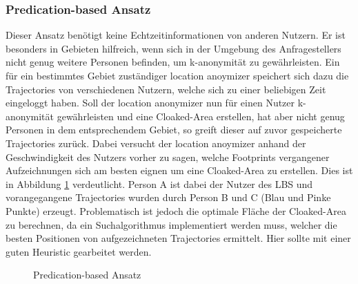\subsubsection{Predication-based Ansatz} 
Dieser Ansatz benötigt keine Echtzeitinformationen von anderen Nutzern. Er ist besonders in Gebieten hilfreich, wenn sich in der Umgebung des Anfragestellers nicht genug weitere Personen befinden, um k-anonymität zu gewährleisten. Ein für ein bestimmtes Gebiet zuständiger location anoymizer speichert sich dazu die Trajectories von verschiedenen Nutzern, welche sich zu einer beliebigen Zeit eingeloggt haben. Soll der location anonymizer nun für einen Nutzer k-anonymität gewährleisten und eine Cloaked-Area erstellen, hat aber nicht genug Personen in dem entsprechendem Gebiet, so greift dieser auf zuvor gespeicherte Trajectories zurück. Dabei versucht der location anoymizer anhand der Geschwindigkeit des Nutzers vorher zu sagen, welche Footprints vergangener Aufzeichnungen sich am besten eignen um eine Cloaked-Area zu erstellen. Dies ist in Abbildung \ref{fig_chow2011_PredicationBased-Ansatz} verdeutlicht. Person A ist dabei der Nutzer des LBS und vorangegangene Trajectories wurden durch Person B und C (Blau und Pinke Punkte) erzeugt. Problematisch ist jedoch die optimale Fläche der Cloaked-Area zu berechnen, da ein Suchalgorithmus implementiert werden muss, welcher die besten Positionen von aufgezeichneten Trajectories ermittelt. Hier sollte mit einer guten Heuristic gearbeitet werden. 
\begin{figure}[!h]
		\centering
		\caption{Predication-based Ansatz}
		\label{fig_chow2011_PredicationBased-Ansatz}
\end{figure}

